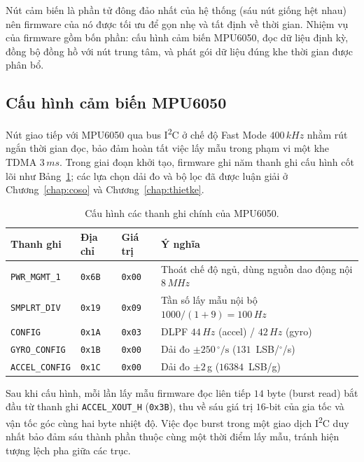 \documentclass[../DoAn.tex]{subfiles}
\begin{document}
Nút cảm biến là phần tử đông đảo nhất của hệ thống (sáu nút giống hệt nhau) nên firmware của nó được tối ưu để gọn nhẹ và tất định về thời gian. Nhiệm vụ của firmware gồm bốn phần: cấu hình cảm biến MPU6050, đọc dữ liệu định kỳ, đồng bộ đồng hồ với nút trung tâm, và phát gói dữ liệu đúng khe thời gian được phân bổ.

\subsection{Cấu hình cảm biến MPU6050}
Nút giao tiếp với MPU6050 qua bus I\textsuperscript{2}C ở chế độ Fast Mode $400\,\si{kHz}$ nhằm rút ngắn thời gian đọc, bảo đảm hoàn tất việc lấy mẫu trong phạm vi một khe TDMA $3\,\si{ms}$. Trong giai đoạn khởi tạo, firmware ghi năm thanh ghi cấu hình cốt lõi như Bảng~\ref{tab:mpu_reg}; các lựa chọn dải đo và bộ lọc đã được luận giải ở Chương~\ref{chap:coso} và Chương~\ref{chap:thietke}.

\begin{table}[H]
    \centering
    \caption{Cấu hình các thanh ghi chính của MPU6050.}
    \label{tab:mpu_reg}
    \begin{tabular}{p{3.1cm} p{1.7cm} p{1.7cm} p{5.4cm}}
        \toprule
        \textbf{Thanh ghi}     & \textbf{Địa chỉ} & \textbf{Giá trị} & \textbf{Ý nghĩa}                                               \\
        \midrule
        \texttt{PWR\_MGMT\_1}  & \texttt{0x6B}    & \texttt{0x00}    & Thoát chế độ ngủ, dùng nguồn dao động nội $8\,\si{MHz}$        \\
        \texttt{SMPLRT\_DIV}   & \texttt{0x19}    & \texttt{0x09}    & Tần số lấy mẫu nội bộ $1000/(1+9)=100\,\si{Hz}$                \\
        \texttt{CONFIG}        & \texttt{0x1A}    & \texttt{0x03}    & DLPF $44\,\si{Hz}$ (accel) / $42\,\si{Hz}$ (gyro)              \\
        \texttt{GYRO\_CONFIG}  & \texttt{0x1B}    & \texttt{0x00}    & Dải đo $\pm 250\,^{\circ}/\mathrm{s}$ ($131$~LSB/$^{\circ}$/s) \\
        \texttt{ACCEL\_CONFIG} & \texttt{0x1C}    & \texttt{0x00}    & Dải đo $\pm 2\,$g ($16384$~LSB/g)                              \\
        \bottomrule
    \end{tabular}
\end{table}

Sau khi cấu hình, mỗi lần lấy mẫu firmware đọc liên tiếp $14$ byte (burst read) bắt đầu từ thanh ghi \texttt{ACCEL\_XOUT\_H} (\texttt{0x3B}), thu về sáu giá trị $16$-bit của gia tốc và vận tốc góc cùng hai byte nhiệt độ. Việc đọc burst trong một giao dịch I\textsuperscript{2}C duy nhất bảo đảm sáu thành phần thuộc cùng một thời điểm lấy mẫu, tránh hiện tượng lệch pha giữa các trục.
\end{document}
